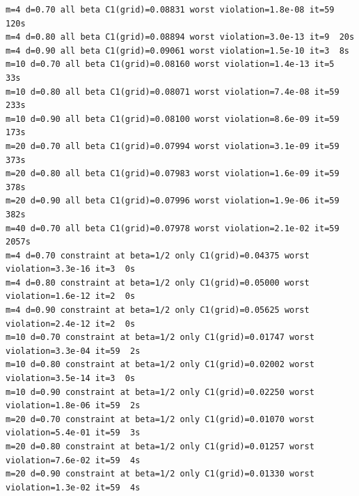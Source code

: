 \documentclass[11pt,reqno]{amsart}
\numberwithin{equation}{section}
\theoremstyle{definition}
\theoremstyle{remark}
\begin{document}
\begin{lstlisting}
m=4 d=0.70 all beta C1(grid)=0.08831 worst violation=1.8e-08 it=59  120s
m=4 d=0.80 all beta C1(grid)=0.08894 worst violation=3.0e-13 it=9  20s
m=4 d=0.90 all beta C1(grid)=0.09061 worst violation=1.5e-10 it=3  8s
m=10 d=0.70 all beta C1(grid)=0.08160 worst violation=1.4e-13 it=5  33s
m=10 d=0.80 all beta C1(grid)=0.08071 worst violation=7.4e-08 it=59  233s
m=10 d=0.90 all beta C1(grid)=0.08100 worst violation=8.6e-09 it=59  173s
m=20 d=0.70 all beta C1(grid)=0.07994 worst violation=3.1e-09 it=59  373s
m=20 d=0.80 all beta C1(grid)=0.07983 worst violation=1.6e-09 it=59  378s
m=20 d=0.90 all beta C1(grid)=0.07996 worst violation=1.9e-06 it=59  382s
m=40 d=0.70 all beta C1(grid)=0.07978 worst violation=2.1e-02 it=59  2057s
m=4 d=0.70 constraint at beta=1/2 only C1(grid)=0.04375 worst violation=3.3e-16 it=3  0s
m=4 d=0.80 constraint at beta=1/2 only C1(grid)=0.05000 worst violation=1.6e-12 it=2  0s
m=4 d=0.90 constraint at beta=1/2 only C1(grid)=0.05625 worst violation=2.4e-12 it=2  0s
m=10 d=0.70 constraint at beta=1/2 only C1(grid)=0.01747 worst violation=3.3e-04 it=59  2s
m=10 d=0.80 constraint at beta=1/2 only C1(grid)=0.02002 worst violation=3.5e-14 it=3  0s
m=10 d=0.90 constraint at beta=1/2 only C1(grid)=0.02250 worst violation=1.8e-06 it=59  2s
m=20 d=0.70 constraint at beta=1/2 only C1(grid)=0.01070 worst violation=5.4e-01 it=59  3s
m=20 d=0.80 constraint at beta=1/2 only C1(grid)=0.01257 worst violation=7.6e-02 it=59  4s
m=20 d=0.90 constraint at beta=1/2 only C1(grid)=0.01330 worst violation=1.3e-02 it=59  4s
\end{lstlisting}
\clearpage
\end{document}
